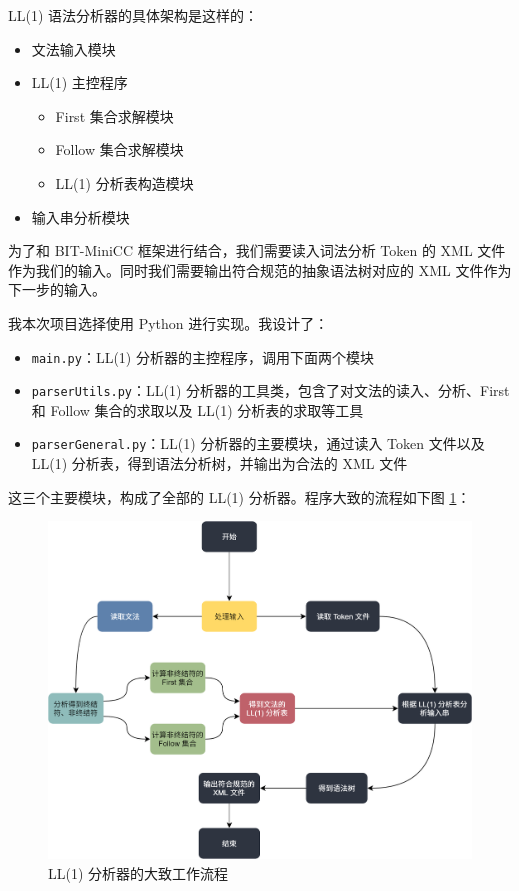 \documentclass[UTF8]{ctexart}
\begin{document}
LL(1) 语法分析器的具体架构是这样的：

\begin{itemize}
  \item 文法输入模块
  \item LL(1) 主控程序
  \begin{itemize}
    \item First 集合求解模块
    \item Follow 集合求解模块
    \item LL(1) 分析表构造模块
  \end{itemize}
  \item 输入串分析模块
\end{itemize}

为了和 BIT-MiniCC 框架进行结合，我们需要读入词法分析 Token 的 XML 文件作为我们的输入。同时我们需要输出符合规范的抽象语法树对应的 XML 文件作为下一步的输入。

我本次项目选择使用 Python 进行实现。我设计了：

\begin{itemize}
  \item \texttt{main.py}：LL(1) 分析器的主控程序，调用下面两个模块
  \item \texttt{parserUtils.py}：LL(1) 分析器的工具类，包含了对文法的读入、分析、First 和 Follow 集合的求取以及 LL(1) 分析表的求取等工具
  \item \texttt{parserGeneral.py}：LL(1) 分析器的主要模块，通过读入 Token 文件以及 LL(1) 分析表，得到语法分析树，并输出为合法的 XML 文件
\end{itemize}

这三个主要模块，构成了全部的 LL(1) 分析器。程序大致的流程如下图 \ref{fig:figure1}：

\begin{figure}[h]
  \includegraphics[width=\linewidth]{images/ll1.png}
  \caption{LL(1) 分析器的大致工作流程}
  \label{fig:figure1}
\end{figure}
\end{document}
